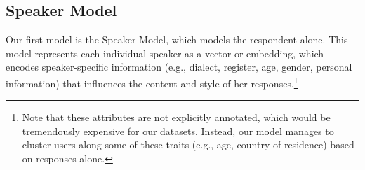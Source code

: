 \subsection{Speaker Model}
Our first model is the Speaker Model, which 
models the respondent alone.
This model represents each individual speaker as a vector or embedding, which encodes 
speaker-specific information (e.g., dialect, register, age, gender, personal information) that influences the content and style of her responses.\footnote{Note that these attributes are not explicitly annotated, which would be tremendously expensive for our datasets. Instead, our model manages to cluster users along some of these traits (e.g., age, country of residence) based on responses alone.}

